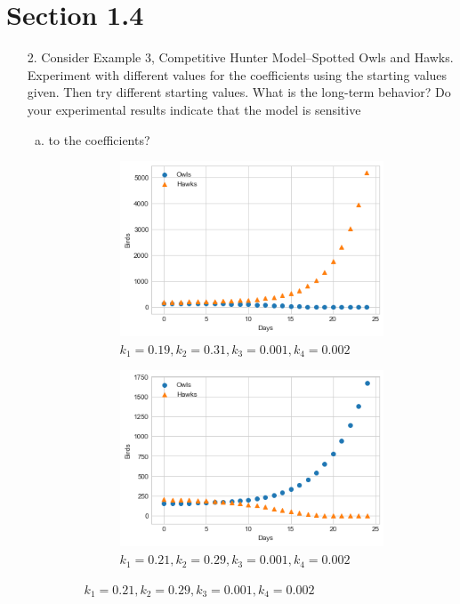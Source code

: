 \documentclass[10pt]{report}
\begin{document}
\section*{Section 1.4}
\begin{enumerate}
	\item [2.]
	Consider Example 3, Competitive Hunter Model--Spotted Owls and Hawks. Experiment with different values for the coefficients using the starting values given. Then try different starting values. What is the long-term behavior? Do your experimental results indicate that the model is sensitive
	\begin{enumerate}[a.]
		\item 
		to the coefficients?
		\begin{figure}[H]
			\centering
			\begin{subfigure}[b]{.5\linewidth}
				\caption{$k_1 = 0.19, k_2 = 0.31, k_3 = 0.001, k_4 = 0.002$}
				\includegraphics[width=\linewidth]{s1_4/k12-1.png}
			\end{subfigure}%
			\begin{subfigure}[b]{.5\linewidth}
				\caption{$k_1 = 0.21, k_2 = 0.29, k_3 = 0.001, k_4 = 0.002$}
				\includegraphics[width=\linewidth]{s1_4/k12-2.png}

\end{subfigure}
\end{figure}
\end{enumerate}
\end{enumerate}
\end{document}
